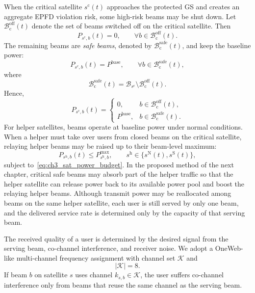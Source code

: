 When the critical satellite $s^{\mathrm{c}}(t)$ approaches the protected GS and creates an aggregate EPFD violation risk, some high-risk beams may be shut down. Let $\mathcal{B}_{\mathrm{c}}^{\mathrm{off}}(t)$ denote the set of beams switched off on the critical satellite. Then
\begin{equation*}
P_{s^{\mathrm{c}},b}(t)=0,\qquad \forall b\in\mathcal{B}_{\mathrm{c}}^{\mathrm{off}}(t).
\end{equation*}
The remaining beams are \emph{safe beams}, denoted by $\mathcal{B}_{\mathrm{c}}^{\mathrm{safe}}(t)$, and keep the baseline power:
\begin{equation*}
P_{s^{\mathrm{c}},b}(t)=P^{\mathrm{base}},\qquad \forall b\in\mathcal{B}_{\mathrm{c}}^{\mathrm{safe}}(t),
\end{equation*}
where
\begin{equation*}
\mathcal{B}_{\mathrm{c}}^{\mathrm{safe}}(t)=\mathcal{B}_{s^{\mathrm{c}}}\setminus\mathcal{B}_{\mathrm{c}}^{\mathrm{off}}(t).
\end{equation*}
Hence,
\begin{equation*}
P_{s^{\mathrm{c}},b}(t)=
\begin{cases}
0, & b\in\mathcal{B}_{\mathrm{c}}^{\mathrm{off}}(t),\\
P^{\mathrm{base}}, & b\in\mathcal{B}_{\mathrm{c}}^{\mathrm{safe}}(t).
\end{cases}
\end{equation*}
For helper satellites, beams operate at baseline power under normal conditions. When a helper must take over users from closed beams on the critical satellite, relaying helper beams may be raised up to their beam-level maximum:
\begin{equation*}
P_{s^{\mathrm{h}},b}(t)\le P_{s^{\mathrm{h}},b}^{\max},\qquad s^{\mathrm{h}}\in\{s^{\mathrm{N}}(t),s^{\mathrm{S}}(t)\},
\end{equation*}
subject to~\eqref{eq:ch3_sat_power_budget}. In the proposed method of the next chapter, critical safe beams may absorb part of the helper traffic so that the helper satellite can release power back to its available power pool and boost the relaying helper beams. Although transmit power may be reallocated among beams on the same helper satellite, each user is still served by only one beam, and the delivered service rate is determined only by the capacity of that serving beam.

The received quality of a user is determined by the desired signal from the serving beam, co-channel interference, and receiver noise. We adopt a OneWeb-like multi-channel frequency assignment with channel set $\mathcal{K}$ and
\begin{equation*}
|\mathcal{K}|=8.
\end{equation*}
If beam $b$ on satellite $s$ uses channel $k_{s,b}\in\mathcal{K}$, the user suffers co-channel interference only from beams that reuse the same channel as the serving beam.

